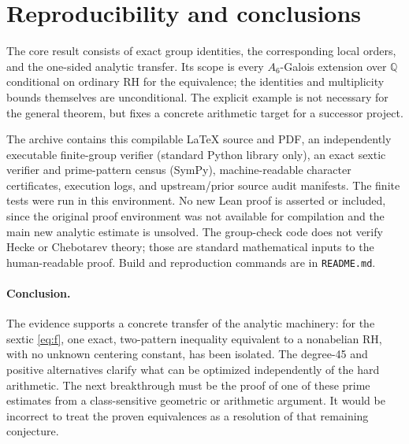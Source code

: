 \documentclass[11pt,letterpaper]{article}
\theoremstyle{remark}\newtheorem{remark}[theorem]{Remark}
\newcommand{\Q}{\mathbb Q}\newcommand{\C}{\mathbb C}\newcommand{\R}{\mathbb R}
\newcommand{\code}[1]{\nolinkurl{#1}}
\begin{document}
\section{Reproducibility and conclusions}
The core result consists of exact group identities, the corresponding local orders, and the one-sided analytic transfer. Its scope is every $A_6$-Galois extension over $\Q$ conditional on ordinary RH for the equivalence; the identities and multiplicity bounds themselves are unconditional. The explicit example is not necessary for the general theorem, but fixes a concrete arithmetic target for a successor project.

The archive contains this compilable \LaTeX{} source and PDF, an independently executable finite-group verifier (standard Python library only), an exact sextic verifier and prime-pattern census (SymPy), machine-readable character certificates, execution logs, and upstream/prior source audit manifests. The finite tests were run in this environment. No new Lean proof is asserted or included, since the original proof environment was not available for compilation and the main new analytic estimate is unsolved. The group-check code does not verify Hecke or Chebotarev theory; those are standard mathematical inputs to the human-readable proof. Build and reproduction commands are in \code{README.md}.

\paragraph{Conclusion.} The evidence supports a concrete transfer of the analytic machinery: for the sextic \eqref{eq:f}, one exact, two-pattern inequality equivalent to a nonabelian RH, with no unknown centering constant, has been isolated. The degree-45 and positive alternatives clarify what can be optimized independently of the hard arithmetic. The next breakthrough must be the proof of one of these prime estimates from a class-sensitive geometric or arithmetic argument. It would be incorrect to treat the proven equivalences as a resolution of that remaining conjecture.
\end{document}
